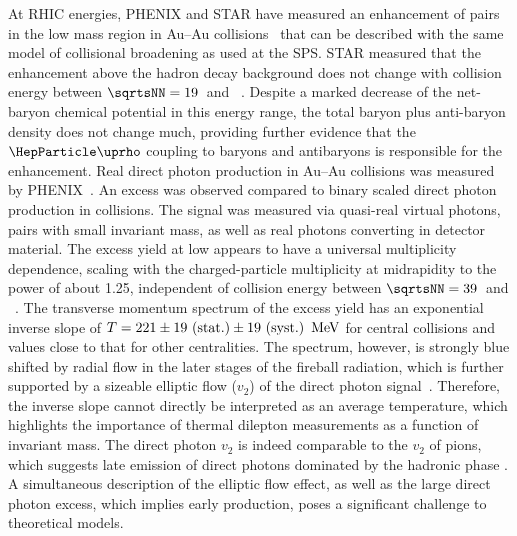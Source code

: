 \documentclass[../report.tex]{subfiles}
\begin{document}
At RHIC energies, PHENIX and STAR have measured an enhancement of \Pepem pairs in the low mass region in Au--Au collisions~\cite{Adare:2009qk,Adare:2015ila,Adamczyk:2013caa,Adamczyk:2015mmx} that can be described with the same model of collisional broadening as used at the SPS. STAR measured that the enhancement above the hadron decay background does not change with collision energy between $\sqrtsNN=\unit[19]{}$ and \unit[200]{\UGeV}~\cite{Adamczyk:2015mmx}. Despite a marked decrease of the net-baryon chemical potential in this energy range, the total baryon plus anti-baryon density does not change much, providing further evidence that the $\PGr$ coupling to baryons and antibaryons is responsible for the enhancement.
Real direct photon production in Au--Au collisions was measured by PHENIX~\cite{Adare:2008ab,Adare:2014fwh,Adare:2018wgc}. An excess was observed compared to binary scaled direct photon production in \pp{} collisions. The signal was measured via quasi-real virtual photons, \ie \Pepem pairs  with small invariant mass, as well as real photons converting in detector material. The excess yield at low \pT{} appears to have a universal multiplicity dependence, scaling with the charged-particle multiplicity at midrapidity to the power of about 1.25, independent of collision energy between $\sqrtsNN = \unit[39]{}$ and \unit[200]{\UGeV}~\cite{Adare:2018wgc}. The transverse momentum spectrum of the excess yield has an exponential inverse slope of $T=\unit[221\pm19~\mathrm{(stat.)}\pm19~\mathrm{(syst.)}]{\UMeV}$ for central collisions and values close to that for other centralities. The spectrum, however, is strongly blue shifted by radial flow in the later stages of the fireball radiation, which is further supported by a sizeable elliptic flow ($v_2$) of the direct photon signal~\cite{Adare:2011zr}. Therefore, the inverse slope cannot directly be interpreted as an average temperature, which highlights the importance of thermal dilepton measurements as a function of invariant mass. The direct photon $v_2$ is indeed comparable to the $v_2$ of pions, which suggests late emission of direct photons dominated by the hadronic phase \cite{vanHees:2011vb}. A simultaneous description of the elliptic flow effect, as well as the large direct photon excess, which implies early production, poses a significant challenge to theoretical models.
\end{document}
